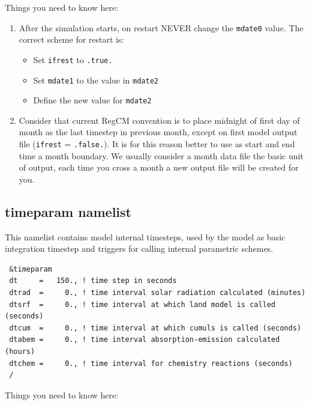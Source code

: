 Things you need to know here:

\begin{enumerate}
\item After the simulation starts, on restart NEVER change the \verb=mdate0=
value. The correct scheme for restart is:
\begin{itemize}
\item Set \verb=ifrest= to \verb=.true.=
\item Set \verb=mdate1= to the value in \verb=mdate2=
\item Define the new value for \verb=mdate2=
\end{itemize}
\item Consider that current RegCM convention is to place midnight of first
day of month as the last timestep in previous month, except on first model
output file (\verb=ifrest= = \verb=.false.=). It is for this reason better
to use as start and end time a month boundary. We usually consider a month
data file the basic unit of output, each time you cross a month a new output
file will be created for you.
\end{enumerate}

\subsection{timeparam namelist}

This namelist contains model internal timesteps, used by the model as basic
integration timestep and triggers for calling internal parametric schemes.

{\footnotesize
\begin{Verbatim}
 &timeparam
 dt     =   150., ! time step in seconds
 dtrad  =     0., ! time interval solar radiation calculated (minutes)
 dtsrf  =     0., ! time interval at which land model is called (seconds)
 dtcum  =     0., ! time interval at which cumuls is called (seconds)
 dtabem =     0., ! time interval absorption-emission calculated (hours)
 dtchem =     0., ! time interval for chemistry reactions (seconds)
 /
\end{Verbatim}
}

Things you need to know here:

